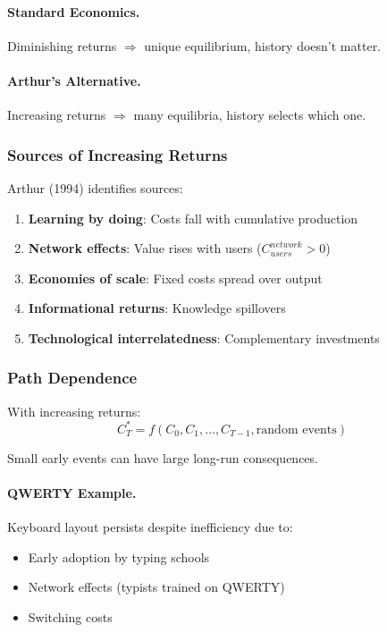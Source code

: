 \paragraph{Standard Economics.}
Diminishing returns $\Rightarrow$ unique equilibrium, history doesn't matter.

\paragraph{Arthur's Alternative.}
Increasing returns $\Rightarrow$ many equilibria, history selects which one.

\subsubsection{Sources of Increasing Returns}

Arthur (1994) identifies sources:
\begin{enumerate}
    \item \textbf{Learning by doing}: Costs fall with cumulative production
    \item \textbf{Network effects}: Value rises with users ($C_{users}^{network} > 0$)
    \item \textbf{Economies of scale}: Fixed costs spread over output
    \item \textbf{Informational returns}: Knowledge spillovers
    \item \textbf{Technological interrelatedness}: Complementary investments
\end{enumerate}

\subsubsection{Path Dependence}

With increasing returns:
\begin{equation}
\boxed{
C^*_T = f(C_0, C_1, \ldots, C_{T-1}, \text{random events})
}
\label{eq:path-dependence}
\end{equation}

Small early events can have large long-run consequences.

\paragraph{QWERTY Example.}
Keyboard layout persists despite inefficiency due to:
\begin{itemize}
    \item Early adoption by typing schools
    \item Network effects (typists trained on QWERTY)
    \item Switching costs
\end{itemize}

